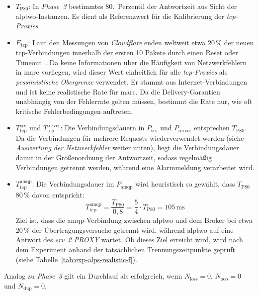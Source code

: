 \begin{itemize}
    \item $T_{\text{P80}}$: In \textit{Phase~3} bestimmtes 80.~Perzentil der Antwortzeit aus Sicht der \gls{alptwo}-Instanzen. Es dient als Referenzwert für die Kalibrierung der \textit{\gls{tcp}-Proxies}.

    \item $E_{\text{tcp}}$: Laut den Messungen von \textit{Cloudflare} enden weltweit etwa 20\,\% der neuen \gls{tcp}-Verbindungen innerhalb der ersten 10 Pakete durch einen Reset oder Timeout~\citep{valenta2024}. Da keine Informationen über die Häufigkeit von Netzwerkfehlern in \gls{marc} vorliegen, wird dieser Wert einheitlich für alle \textit{\gls{tcp}-Proxies} als \textit{pessimistische Obergrenze} verwendet. Er stammt aus Internet-Verbindungen und ist keine realistische Rate für \gls{marc}. Da die Delivery-Garantien unabhängig von der Fehlerrate gelten müssen, bestimmt die Rate nur, wie oft kritische Fehlerbedingungen auftreten.

    \item $T_{\text{tcp}}^{\text{srv}}$ und $T_{\text{tcp}}^{\text{server}}$: Die Verbindungsdauern in $P_{\text{srv}}$ und $P_{\text{server}}$ entsprechen $T_{\text{P80}}$. Da die Verbindungen für mehrere Requests wiederverwendet werden (siehe \textit{Auswertung der Netzwerkfehler} weiter unten), liegt die Verbindungsdauer damit in der Größenordnung der Antwortzeit, sodass regelmäßig Verbindungen getrennt werden, während eine Alarmmeldung verarbeitet wird.

    \item $T_{\text{tcp}}^{\text{amqp}}$: Die Verbindungsdauer im $P_{\text{amqp}}$ wird heuristisch so gewählt, dass $T_{\text{P80}}$ 80\,\% davon entspricht:
          \begin{equation}
              T_{\text{tcp}}^{\text{amqp}} = \frac{T_{\text{P80}}}{0{,}8} = \frac{5}{4} \cdot T_{\text{P80}} = 105\,\text{ms}
          \end{equation}
          Ziel ist, dass die \gls{amqp}-Verbindung zwischen \gls{alptwo} und dem Broker bei etwa 20\,\% der Übertragungsversuche getrennt wird, während \gls{alptwo} auf eine Antwort des \textit{\gls{srv}~2 PROXY} wartet. Ob dieses Ziel erreicht wird, wird nach dem Experiment anhand der tatsächlichen Trennungszeitpunkte geprüft (siehe Tabelle~\ref{tab:exp-alps-realistic-f}).
\end{itemize}

Analog zu \textit{Phase~3} gilt ein Durchlauf als erfolgreich, wenn $N_{\text{loss}} = 0$, $N_{\text{ooo}} = 0$ und $N_{\text{dup}} = 0$.

